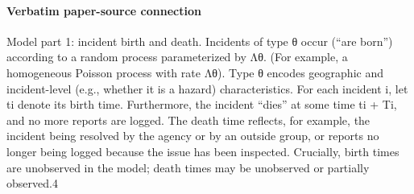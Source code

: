 \documentclass[10pt]{article}
\begin{document}
\paragraph{Verbatim paper-source connection}
\begin{ReviewVerbatim}
Model part 1: incident birth and death. Incidents of type θ occur (“are born”) according to
a random process parameterized by Λθ. (For example, a homogeneous Poisson process with rate
Λθ). Type θ encodes geographic and incident-level (e.g., whether it is a hazard) characteristics. For
each incident i, let ti denote its birth time. Furthermore, the incident “dies” at some time ti + Ti,
and no more reports are logged. The death time reflects, for example, the incident being resolved
by the agency or by an outside group, or reports no longer being logged because the issue has been
inspected. Crucially, birth times are unobserved in the model; death times may be unobserved or
partially observed.4
\end{ReviewVerbatim}
\end{document}
